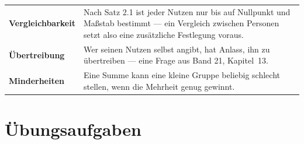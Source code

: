 \begin{warnung}
\begin{center}
{\small
\renewcommand{\arraystretch}{1.52}
\begin{tabular}{@{}P{2.8cm}P{5.8cm}@{}}
\toprule
\textbf{Vergleichbarkeit} & Nach Satz 2.1 ist jeder Nutzen nur bis auf Nullpunkt und Maßstab bestimmt --- ein Vergleich zwischen Personen setzt also eine zusätzliche Festlegung voraus.\\
\textbf{Übertreibung} & Wer seinen Nutzen selbst angibt, hat Anlass, ihn zu übertreiben --- eine Frage aus Band 21, Kapitel~13.\\
\textbf{Minderheiten} & Eine Summe kann eine kleine Gruppe beliebig schlecht stellen, wenn die Mehrheit genug gewinnt.\\
\bottomrule
\end{tabular}}
\end{center}

\begin{center}
\begin{minipage}{0.88\textwidth}
\end{minipage}
\end{center}
\end{warnung}

\section{Übungsaufgaben}

